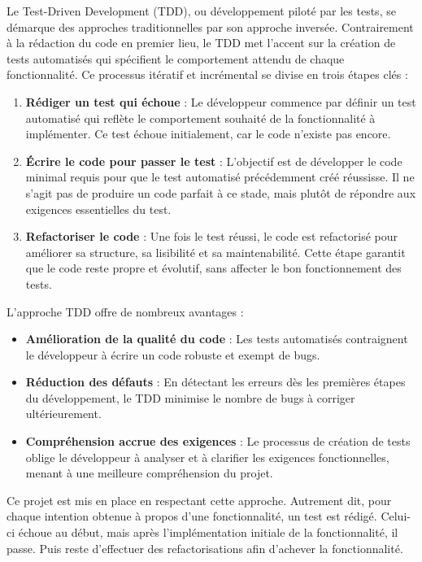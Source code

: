 Le Test-Driven Development (TDD), ou développement piloté par les tests, se démarque des approches traditionnelles par son approche inversée. Contrairement à la rédaction du code en premier lieu, le TDD met l'accent sur la création de tests automatisés qui spécifient le comportement attendu de chaque fonctionnalité. Ce processus itératif et incrémental se divise en trois étapes clés :
\begin{enumerate}

    \item \textbf{Rédiger un test qui échoue} : Le développeur commence par définir un test automatisé qui reflète le comportement souhaité de la fonctionnalité à implémenter. Ce test échoue initialement, car le code n'existe pas encore.

    \item \textbf{Écrire le code pour passer le test} : L'objectif est de développer le code minimal requis pour que le test automatisé précédemment créé réussisse. Il ne s'agit pas de produire un code parfait à ce stade, mais plutôt de répondre aux exigences essentielles du test.

    \item \textbf{Refactoriser le code} : Une fois le test réussi, le code est refactorisé pour améliorer sa structure, sa lisibilité et sa maintenabilité. Cette étape garantit que le code reste propre et évolutif, sans affecter le bon fonctionnement des tests.
\end{enumerate}

L'approche TDD offre de nombreux avantages :
\begin{itemize}
    \item \textbf{Amélioration de la qualité du code} : Les tests automatisés contraignent le développeur à écrire un code robuste et exempt de bugs.

    \item \textbf{Réduction des défauts} : En détectant les erreurs dès les premières étapes du développement, le TDD minimise le nombre de bugs à corriger ultérieurement.

    \item \textbf{Compréhension accrue des exigences} : Le processus de création de tests oblige le développeur à analyser et à clarifier les exigences fonctionnelles, menant à une meilleure compréhension du projet.
\end{itemize}

Ce projet est mis en place en respectant cette approche. Autrement dit, pour chaque intention obtenue à propos d’une fonctionnalité, un test est rédigé. Celui-ci échoue au début, mais après l’implémentation initiale de la fonctionnalité, il passe. Puis reste d’effectuer des refactorisations afin d’achever la fonctionnalité.



